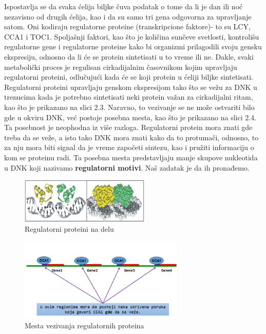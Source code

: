 Ispostavlja se da svaka ćelija biljke čuva podatak o tome da li je dan ili noć nezavisno od drugih ćelija, kao i da su samo tri gena odgovorna za upravljanje satom. Oni kodiraju regulatorne proteine (transkripcione faktore)- to su LCY, CCA1 i TOC1. Spoljašnji faktori, kao što je količina sunčeve svetlosti, kontrolišu regulatorne gene i regulatorne proteine kako bi organizmi prilagodili svoju gensku ekspresiju, odnosno da li će se protein sintetisati u to vreme ili ne. Dakle, svaki metabolički proces je regulisan cirkadijalnim časovnikom kojim upravljaju regulatorni proteini, odlučujući kada će se koji protein u ćeliji biljke sintetisati. Regulatorni proteini upravljaju genskom ekspresijom tako što se vežu za DNK u trenucima kada je potrebno sintetisati neki protein važan za cirkadijalni ritam, kao što je prikazano na slici 2.3. Naravno, to vezivanje se ne može ostvariti bilo gde u okviru DNK, već postoje posebna mesta, kao što je prikazano na slici 2.4. Ta posebnost je neophodna iz više razloga. Regulatorni protein mora znati gde treba da se veže, a isto tako DNK mora znati kako da to protumači, odnosno, to za nju mora biti signal da je vreme započeti sintezu, kao i pružiti informaciju o kom se proteinu radi. Ta posebna mesta predstavljaju manje skupove nukleotida u DNK koji nazivamo \textbf{regulatorni motivi}. Naš zadatak je da ih pronađemo. 

\begin{figure}[h]
\caption{Regulatorni proteini na delu}
\centering
\includegraphics[width=0.55\textwidth]{poglavlja/2/slike/14.PNG}
\end{figure}

\begin{figure}[h]
\caption{Mesta vezivanja regulatornih proteina}
\centering
\includegraphics[width=0.7\textwidth]{poglavlja/2/slike/16.PNG}
\end{figure}

